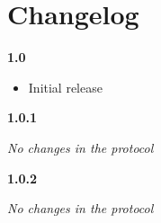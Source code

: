 \chapter{Changelog}

\noindent
\textbf{1.0}
\begin{itemize}
	\renewcommand{\labelitemi}{$\bullet$}
	\item Initial release
\end{itemize}
\newline

\noindent
\textbf{1.0.1}
\begin{itemize}
	\renewcommand{\labelitemi}{$\bullet$}
	\textit{No changes in the protocol}
\end{itemize}
\newline

\noindent
\textbf{1.0.2}
\begin{itemize}
	\renewcommand{\labelitemi}{$\bullet$}
	\textit{No changes in the protocol}
\end{itemize}
\newline
